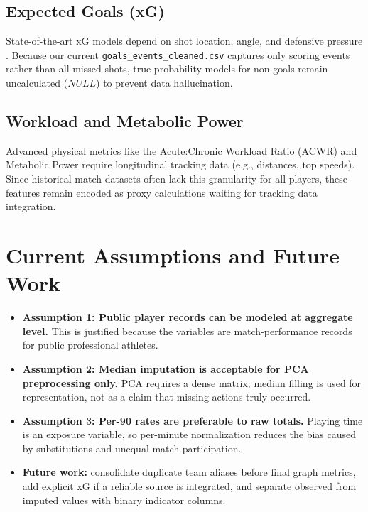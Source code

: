 \documentclass[12pt,a4paper]{article}
\begin{document}
\subsection{Expected Goals (xG)}
State-of-the-art xG models depend on shot location, angle, and defensive pressure \cite{anzer2021xg}. Because our current \texttt{goals\_events\_cleaned.csv} captures only scoring events rather than all missed shots, true probability models for non-goals remain uncalculated ($NULL$) to prevent data hallucination.

\subsection{Workload and Metabolic Power}
Advanced physical metrics like the Acute:Chronic Workload Ratio (ACWR) \cite{rossi2018acwr} and Metabolic Power \cite{osgnach2010metabolic} require longitudinal tracking data (e.g., distances, top speeds). Since historical match datasets often lack this granularity for all players, these features remain encoded as proxy calculations waiting for tracking data integration.

\section{Current Assumptions and Future Work}
\begin{itemize}
    \item \textbf{Assumption 1: Public player records can be modeled at aggregate level.} This is justified because the variables are match-performance records for public professional athletes.
    \item \textbf{Assumption 2: Median imputation is acceptable for PCA preprocessing only.} PCA requires a dense matrix; median filling is used for representation, not as a claim that missing actions truly occurred.
    \item \textbf{Assumption 3: Per-90 rates are preferable to raw totals.} Playing time is an exposure variable, so per-minute normalization reduces the bias caused by substitutions and unequal match participation.
    \item \textbf{Future work:} consolidate duplicate team aliases before final graph metrics, add explicit xG if a reliable source is integrated, and separate observed from imputed values with binary indicator columns.
\end{itemize}
\end{document}
